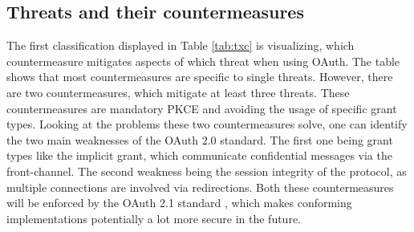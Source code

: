 \subsection{Threats and their countermeasures}

The first classification displayed in Table \ref{tab:txc} is visualizing, which countermeasure mitigates aspects of which threat when using OAuth. The table shows that most countermeasures are specific to single threats. However, there are two countermeasures, which mitigate at least three threats. These countermeasures are mandatory PKCE and avoiding the usage of specific grant types. Looking at the problems these two countermeasures solve, one can identify the two main weaknesses of the OAuth 2.0 standard. The first one being grant types like the implicit grant, which communicate confidential messages via the front-channel. The second weakness being the session integrity of the protocol, as multiple connections are involved via redirections. Both these countermeasures will be enforced by the OAuth 2.1 standard \cite{hardt2023rfc}, which makes conforming implementations potentially a lot more secure in the future.


